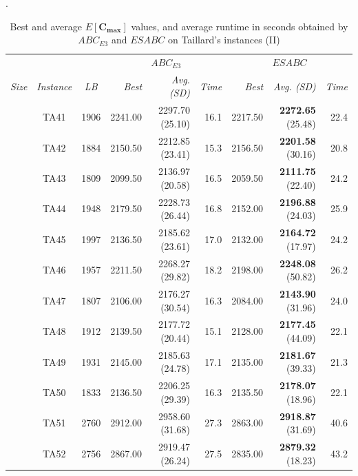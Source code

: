 \documentclass[icae]{iosart2x}
\newcommand{\reviewed}[1]{#1} %
\begin{document}
\begin{appendix}
\begin{table}[htb]
\small
\centering
\caption{\reviewed{Best and average $E[\mathbf{C_{max}}]$ values, and average runtime in seconds obtained by $ABC_{E3}$ and $ESABC$ on Taillard's instances (II)}}.
\setlength{\tabcolsep}{1.5mm}%
\label{table:expResultsTaillard2}
\begin{tabular}{c|c|c|rrr|rrr}
\toprule
& & & \multicolumn{3}{c|}{$ABC_{E3}$ }& \multicolumn{3}{c}{$ESABC$} \\
\textit{Size}& \textit{Instance} & \textit{LB} & \textit{Best} & \textit{Avg. \tiny{(SD)}} & \textit{Time} & \textit{Best} & \textit{Avg. \tiny{(SD)}} & \textit{Time} \\
\midrule
\parbox[t]{2mm}{}
 & TA41 & 1906 & 2241.00 & 2297.70 \tiny{(25.10)} & 16.1 & 2217.50 & \textbf{2272.65} \tiny{(25.48)} & 22.4\\
 & TA42 & 1884 & 2150.50 & 2212.85 \tiny{(23.41)} & 15.3 & 2156.50 & \textbf{2201.58} \tiny{(30.16)} & 20.8\\
 & TA43 & 1809 & 2099.50 & 2136.97 \tiny{(20.58)} & 16.5 & 2059.50 & \textbf{2111.75} \tiny{(22.40)} & 24.2\\
 & TA44 & 1948 & 2179.50 & 2228.73 \tiny{(26.44)} & 16.8 & 2152.00 & \textbf{2196.88} \tiny{(24.03)} & 25.9\\
 & TA45 & 1997 & 2136.50 & 2185.62 \tiny{(23.61)} & 17.0 & 2132.00 & \textbf{2164.72} \tiny{(17.97)} & 24.2\\
 & TA46 & 1957 & 2211.50 & 2268.27 \tiny{(29.82)} & 18.2 & 2198.00 & \textbf{2248.08} \tiny{(50.82)} & 26.2\\
 & TA47 & 1807 & 2106.00 & 2176.27 \tiny{(30.54)} & 16.3 & 2084.00 & \textbf{2143.90} \tiny{(31.96)} & 24.0\\
 & TA48 & 1912 & 2139.50 & 2177.72 \tiny{(20.44)} & 15.1 & 2128.00 & \textbf{2177.45} \tiny{(44.09)} & 22.1\\
 & TA49 & 1931 & 2145.00 & 2185.63 \tiny{(24.78)} & 17.1 & 2135.00 & \textbf{2181.67} \tiny{(39.33)} & 21.3\\
 & TA50 & 1833 & 2136.50 & 2206.25 \tiny{(29.39)} & 16.3 & 2135.50 & \textbf{2178.07} \tiny{(18.96)} & 22.1\\
\midrule
\parbox[t]{2mm}{}
 & TA51 & 2760 & 2912.00 & 2958.60 \tiny{(31.68)} & 27.3 & 2863.00 & \textbf{2918.87} \tiny{(31.69)} & 40.6\\
 & TA52 & 2756 & 2867.00 & 2919.47 \tiny{(26.24)} & 27.5 & 2835.00 & \textbf{2879.32} \tiny{(18.23)} & 43.2\\

\end{tabular}
\end{table}
\end{appendix}
\end{document}
